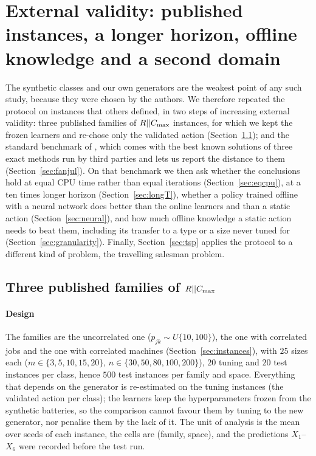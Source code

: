 \section{External validity: published instances, a longer horizon, offline knowledge and a second domain}
\label{sec:external}
The synthetic classes and our own generators are the weakest point of any such study, because they were chosen by the authors. We therefore repeated the protocol on instances that others defined, in two steps of increasing external validity: three published families of $R||C_{\max}$ instances, for which we kept the frozen learners and re-chose only the validated action (Section~\ref{sec:families}); and the standard benchmark of \citet{FanjulPeyroRuiz2010}, which comes with the best known solutions of three exact methods run by third parties and lets us report the distance to them (Section~\ref{sec:fanjul}). On that benchmark we then ask whether the conclusions hold at equal CPU time rather than equal iterations (Section~\ref{sec:eqcpu}), at a ten times longer horizon (Section~\ref{sec:longT}), whether a policy trained offline with a neural network does better than the online learners and than a static action (Section~\ref{sec:neural}), and how much offline knowledge a static action needs to beat them, including its transfer to a type or a size never tuned for (Section~\ref{sec:granularity}). Finally, Section~\ref{sec:tsp} applies the protocol to a different kind of problem, the travelling salesman problem.

\subsection{Three published families of $R||C_{\max}$}
\label{sec:families}
\paragraph{Design} The families are the uncorrelated one ($p_{jk}\sim U\{10,100\}$), the one with correlated jobs and the one with correlated machines (Section~\ref{sec:instances}), with $25$ sizes each ($m\in\{3,5,10,15,20\}$, $n\in\{30,50,80,100,200\}$), $20$ tuning and $20$ test instances per class, hence $500$ test instances per family and space. Everything that depends on the generator is re-estimated on the tuning instances (the validated action per class); the learners keep the hyperparameters frozen from the synthetic batteries, so the comparison cannot favour them by tuning to the new generator, nor penalise them by the lack of it. The unit of analysis is the mean over seeds of each instance, the cells are (family, space), and the predictions $X_1$--$X_6$ were recorded before the test run.

